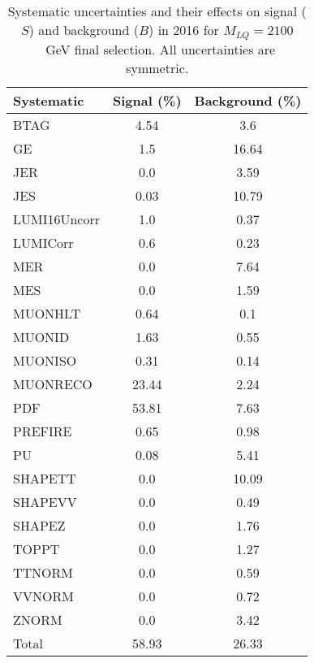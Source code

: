 \begin{table}[htbp]
\begin{center}
\caption{Systematic uncertainties and their effects on signal ($S$) and background ($B$) in 2016 for $M_{LQ}=2100$~GeV final selection. All uncertainties are symmetric.}
\begin{tabular}{lcc}
\hline\hline
Systematic & Signal (\%) & Background (\%) \\ \hline 
BTAG & 4.54 & 3.6\\ 
GE & 1.5 & 16.64\\ 
JER & 0.0 & 3.59\\ 
JES & 0.03 & 10.79\\ 
LUMI16Uncorr & 1.0 & 0.37\\ 
LUMICorr & 0.6 & 0.23\\ 
MER & 0.0 & 7.64\\ 
MES & 0.0 & 1.59\\ 
MUONHLT & 0.64 & 0.1\\ 
MUONID & 1.63 & 0.55\\ 
MUONISO & 0.31 & 0.14\\ 
MUONRECO & 23.44 & 2.24\\ 
PDF & 53.81 & 7.63\\ 
PREFIRE & 0.65 & 0.98\\ 
PU & 0.08 & 5.41\\ 
SHAPETT & 0.0 & 10.09\\ 
SHAPEVV & 0.0 & 0.49\\ 
SHAPEZ & 0.0 & 1.76\\ 
TOPPT & 0.0 & 1.27\\ 
TTNORM & 0.0 & 0.59\\ 
VVNORM & 0.0 & 0.72\\ 
ZNORM & 0.0 & 3.42\\ 
Total & 58.93 & 26.33\\ \hline \hline
\end{tabular}
\label{tab:SysUncertainties_uujj_2100}
\end{center}
\end{table}

